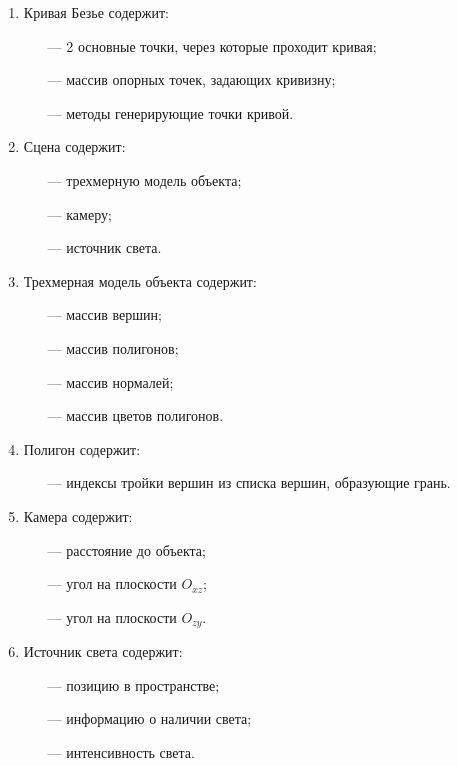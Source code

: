 \begin{enumerate}
    \item Кривая Безье содержит:
    \begin{itemize}
        \item[---] 2 основные точки, через которые проходит кривая;
        \item[---] массив опорных точек, задающих кривизну;
        \item[---] методы генерирующие точки кривой.
    \end{itemize}
    \item Сцена содержит:
    \begin{itemize}
        \item[---] трехмерную модель объекта;
        \item[---] камеру;
        \item[---] источник света.
    \end{itemize}
    \item Трехмерная модель объекта содержит:
    \begin{itemize}
        \item[---] массив вершин;
        \item[---] массив полигонов;
        \item[---] массив нормалей;
        \item[---] массив цветов полигонов.
    \end{itemize}
    \item Полигон содержит:
    \begin{itemize}
        \item[---] индексы тройки вершин из списка вершин, образующие грань.
    \end{itemize}
    \item Камера содержит:
    \begin{itemize}
        \item[---] расстояние до объекта;
        \item[---] угол на плоскости $O_{xz}$;
        \item[---] угол на плоскости $O_{zy}$.
    \end{itemize}
    \item Источник света содержит:
    \begin{itemize}
        \item[---] позицию в пространстве;
        \item[---] информацию о наличии света;
        \item[---] интенсивность света.
    \end{itemize}
\end{enumerate}


